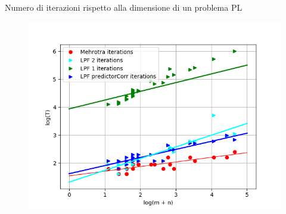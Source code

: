 \begin{frame}
	Numero di iterazioni rispetto alla dimensione di un problema PL
	\begin{figure}
		\includegraphics[width=0.7\paperwidth]{NUM.png}
	\end{figure}
\end{frame}


